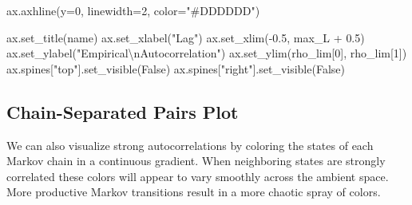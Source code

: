 \documentclass[
  letterpaper,
  DIV=11,
  numbers=noendperiod]{scrartcl}
\newenvironment{Shaded}{\begin{snugshade}}{\end{snugshade}}
\newcommand{\CharTok}[1]{\textcolor[rgb]{0.13,0.47,0.30}{#1}}
\newcommand{\DecValTok}[1]{\textcolor[rgb]{0.68,0.00,0.00}{#1}}
\newcommand{\FloatTok}[1]{\textcolor[rgb]{0.68,0.00,0.00}{#1}}
\newcommand{\NormalTok}[1]{\textcolor[rgb]{0.00,0.23,0.31}{#1}}
\newcommand{\OperatorTok}[1]{\textcolor[rgb]{0.37,0.37,0.37}{#1}}
\newcommand{\StringTok}[1]{\textcolor[rgb]{0.13,0.47,0.30}{#1}}
\newcommand{\VariableTok}[1]{\textcolor[rgb]{0.07,0.07,0.07}{#1}}
\begin{document}
\begin{Shaded}
\begin{Highlighting}[]
\NormalTok{  ax.axhline(y}\OperatorTok{=}\DecValTok{0}\NormalTok{, linewidth}\OperatorTok{=}\DecValTok{2}\NormalTok{, color}\OperatorTok{=}\StringTok{"\#DDDDDD"}\NormalTok{)}

\NormalTok{  ax.set\_title(name)}
\NormalTok{  ax.set\_xlabel(}\StringTok{"Lag"}\NormalTok{)}
\NormalTok{  ax.set\_xlim(}\OperatorTok{{-}}\FloatTok{0.5}\NormalTok{, max\_L }\OperatorTok{+} \FloatTok{0.5}\NormalTok{)}
\NormalTok{  ax.set\_ylabel(}\StringTok{"Empirical}\CharTok{\textbackslash{}n}\StringTok{Autocorrelation"}\NormalTok{)}
\NormalTok{  ax.set\_ylim(rho\_lim[}\DecValTok{0}\NormalTok{], rho\_lim[}\DecValTok{1}\NormalTok{])}
\NormalTok{  ax.spines[}\StringTok{"top"}\NormalTok{].set\_visible(}\VariableTok{False}\NormalTok{)}
\NormalTok{  ax.spines[}\StringTok{"right"}\NormalTok{].set\_visible(}\VariableTok{False}\NormalTok{)}
\end{Highlighting}
\end{Shaded}

\subsection{Chain-Separated Pairs
Plot}\label{chain-separated-pairs-plot}

We can also visualize strong autocorrelations by coloring the states of
each Markov chain in a continuous gradient. When neighboring states are
strongly correlated these colors will appear to vary smoothly across the
ambient space. More productive Markov transitions result in a more
chaotic spray of colors.
\end{document}
